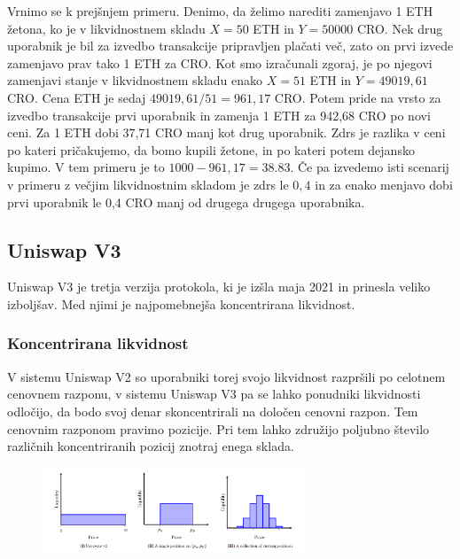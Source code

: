 \documentclass[a4paper,12pt]{article}%
\begin{document}
Vrnimo se k prejšnjem primeru. Denimo, da želimo narediti zamenjavo 1 ETH žetona, ko je v likvidnostnem skladu $X = 50$ ETH in $Y = 50 000$ CRO. Nek drug uporabnik je bil za izvedbo transakcije pripravljen plačati več, zato on prvi izvede zamenjavo prav tako 1 ETH za CRO. Kot smo izračunali zgoraj, je po njegovi zamenjavi stanje v likvidnostnem skladu enako $X = 51$ ETH in $Y = 49019,61$ CRO. Cena ETH je sedaj $49019,61/51 = 961,17$ CRO. Potem pride na vrsto za izvedbo transakcije prvi uporabnik in zamenja 1 ETH za 942,68 CRO po novi ceni. Za 1 ETH dobi 37,71 CRO manj kot drug uporabnik.
Zdrs je razlika v ceni po kateri pričakujemo, da bomo kupili žetone, in po kateri potem dejansko kupimo. V tem primeru je to $1000 - 961,17 = 38.83$. 
Če pa izvedemo isti scenarij v primeru z večjim likvidnostnim skladom je zdrs le $0,4$ in za enako menjavo dobi prvi uporabnik le 0,4 CRO manj od drugega drugega uporabnika.

\subsection{Uniswap V3}

Uniswap V3 je tretja verzija protokola, ki je izšla maja 2021 in prinesla veliko izboljšav. Med njimi je najpomebnejša koncentrirana likvidnost. 

\subsubsection{Koncentrirana likvidnost}

V sistemu Uniswap V2 so uporabniki torej svojo likvidnost razpršili po celotnem cenovnem razponu, v sistemu Uniswap V3 pa se lahko ponudniki likvidnosti odločijo, da bodo svoj denar skoncentrirali na določen cenovni razpon. Tem cenovnim razponom pravimo pozicije. 
Pri tem lahko združijo poljubno število različnih koncentriranih pozicij znotraj enega sklada.

\begin{figure}[!ht]
    \centering
    \includegraphics[width=0.7\textwidth]{pozicije.png}
\end{figure}
\end{document}
